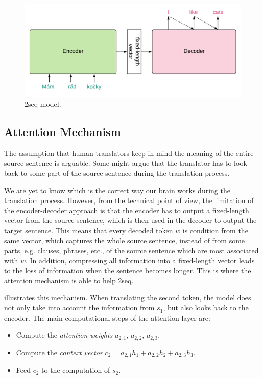 \begin{figure}
    \includegraphics[width=\linewidth]{img/seq2seq.pdf}
    \caption{\seq2seq model.}
    \label{fig:seq2seq}
\end{figure}

\subsection{Attention Mechanism}
\label{the-mt-att}
The assumption that human translators keep in mind the meaning of the entire source sentence is arguable.
Some might argue that the translator has to look back to some part of the source sentence during the translation process.

We are yet to know which is the correct way our brain works during the translation process.
However, from the technical point of view, the limitation of the encoder-decoder approach is that the encoder has to output a fixed-length vector from the source sentence, which is then used in the decoder to output the target sentence.
This means that every decoded token $w$ is condition from the same vector, which captures the whole source sentence, instead of from some parts, e.g. clauses, phrases, etc., of the source sentence which are most associated with $w$.
In addition, compressing all information into a fixed-length vector leads to the loss of information when the sentence becomes longer.
This is where the attention mechanism is able to help \seq2seq.

 illustrates this mechanism. When translating the second token, the model does not only take into account the information from $s_1$, but also looks back to the encoder. The main computational steps of the attention layer are:
\begin{itemize}
    \item Compute the \textit{attention weights} $a_{2,1}$, $a_{2,2}$, $a_{2,3}$.
    \item Compute the \textit{context vector} $c_2 = a_{2,1}h_1 + a_{2,2}h_2 + a_{2,3}h_3$.
    \item Feed $c_2$ to the computation of $s_2$.
\end{itemize}

